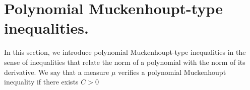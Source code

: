 \documentclass[12pt]{amsart}
\theoremstyle{definition}
\theoremstyle{plain}
\newtheorem{prop}{Proposition}
\theoremstyle{remark}
\newtheorem{remark}{Remark}
\begin{document}
















\section{Polynomial Muckenhoupt-type inequalities.} 

\noindent In this section, we introduce polynomial Muckenhoupt-type inequalities in the sense of inequalities that relate the norm of a polynomial with the norm of its derivative. We say that a measure $\mu$ verifies a polynomial Muckenhoupt inequality if there exists $C>0$ 
\end{document}
